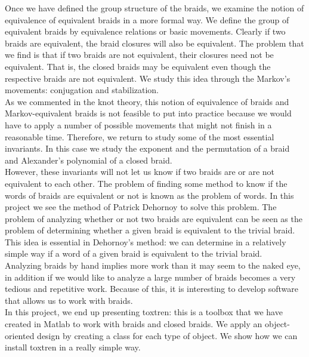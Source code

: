 Once we have defined the group structure of the braids, we examine the notion of equivalence of equivalent braids in a more formal way. We define the group of equivalent braids by equivalence relations or basic movements. Clearly if two braids are equivalent, the braid closures will also be equivalent. The problem that we find is that if two braids are not equivalent, their closures need not be equivalent. That is, the closed braids may be equivalent even though the respective braids are not equivalent. We study this idea through the Markov’s movements: conjugation and stabilization.\\


As we commented in the knot theory, this notion of equivalence of braids and Markov-equivalent braids is not feasible to put into practice because we would have to apply a number of possible movements that might not finish in a reasonable time. Therefore, we return to study some of the most essential invariants. In this case we study the exponent and the permutation of a braid and Alexander's polynomial of a closed braid.\\


However, these invariants will not let us know if two braids are or are not equivalent to each other. The problem of finding some method to know if the words of braids are equivalent or not is known as the problem of words. In this project we see the method of Patrick Dehornoy to solve this problem. The problem of analyzing whether or not two braids are equivalent can be seen as the problem of determining whether a given braid is equivalent to the trivial braid. This idea is essential in Dehornoy's method: we can determine in a relatively simple way if a word of a given braid is equivalent to the trivial braid.\\








Analyzing braids by hand implies more work than it may seem to the naked eye, in addition if we would like to analyze a large number of braids becomes a very tedious and repetitive work. Because of this, it is interesting to develop software that allows us to work with braids.\\








In this project, we end up presenting toxtren: this is a toolbox that we have created in Matlab to work with braids and closed braids. We apply an object-oriented design by creating a class for each type of object. We show how we can install toxtren in a really simple way.\\


